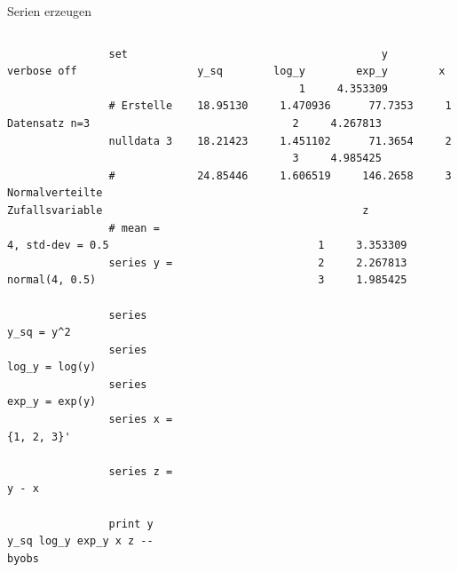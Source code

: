 \documentclass{beamer}[11pt]
\begin{document}
\begin{frame}[fragile]{Serien erzeugen}
	\begin{columns}[T] %
		\scriptsize
		\begin{column}{.4\textwidth}
			\begin{verbatim}
				set verbose off

				# Erstelle Datensatz n=3
				nulldata 3

				# Normalverteilte Zufallsvariable
				# mean = 4, std-dev = 0.5
				series y = normal(4, 0.5)

				series y_sq = y^2
				series log_y = log(y)
				series exp_y = exp(y)
				series x = {1, 2, 3}'

				series z = y - x

				print y y_sq log_y exp_y x z --byobs
			\end{verbatim}
		\end{column}

		\begin{column}{.6\textwidth}
			\tiny
			\begin{verbatim}
				             y         y_sq        log_y        exp_y        x
  				1     4.353309     18.95130     1.470936      77.7353     1
			   2     4.267813     18.21423     1.451102      71.3654     2
			   3     4.985425     24.85446     1.606519     146.2658     3

				          z

				   1     3.353309
				   2     2.267813
				   3     1.985425

			\end{verbatim}
	  \end{column}
	\end{columns}
\end{frame}
\end{document}
